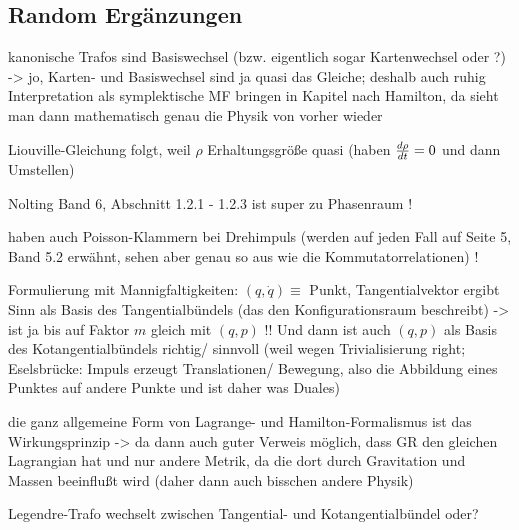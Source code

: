\documentclass[../KlassMech_main.tex]{subfiles}
\begin{document}
		\subsection{Random Ergänzungen}

kanonische Trafos sind Basiswechsel (bzw. eigentlich sogar Kartenwechsel oder ?) -> jo, Karten- und Basiswechsel sind ja quasi das Gleiche; deshalb auch ruhig Interpretation als symplektische MF bringen in Kapitel nach Hamilton, da sieht man dann mathematisch genau die Physik von vorher wieder

Liouville-Gleichung folgt, weil $\rho$ Erhaltungsgröße quasi (haben $\dv{\rho}{t} = 0$ und dann Umstellen)

Nolting Band 6, Abschnitt 1.2.1 - 1.2.3 ist super zu Phasenraum !


haben auch Poisson-Klammern bei Drehimpuls (werden auf jeden Fall auf Seite 5, Band 5.2 erwähnt, sehen aber genau so aus wie die Kommutatorrelationen) !



Formulierung mit Mannigfaltigkeiten: $(q,\dot{q}) \equiv$ Punkt, Tangentialvektor ergibt Sinn als Basis des Tangentialbündels (das den Konfigurationsraum beschreibt) -> ist ja bis auf Faktor $m$ gleich mit $(q, p)$ !! Und dann ist auch $(q,p)$ als Basis des Kotangentialbündels richtig/ sinnvoll (weil wegen Trivialisierung right; Eselsbrücke: Impuls erzeugt Translationen/ Bewegung, also die Abbildung eines Punktes auf andere Punkte und ist daher was Duales)



die ganz allgemeine Form von Lagrange- und Hamilton-Formalismus ist das Wirkungsprinzip -> da dann auch guter Verweis möglich, dass GR den gleichen Lagrangian hat und nur andere Metrik, da die dort durch Gravitation und Massen beeinflußt wird (daher dann auch bisschen andere Physik)

Legendre-Trafo wechselt zwischen Tangential- und Kotangentialbündel oder?
\end{document}
